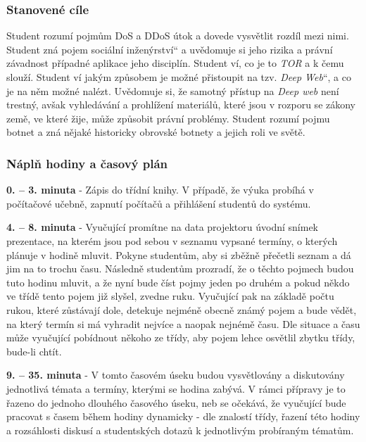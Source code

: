 \documentclass[a4paper, 12pt]{article}
\providecommand{\uv}[1]{\quotedblbase #1\textquotedblleft}
\begin{document}
\subsubsection{Stanovené cíle}
Student rozumí pojmům DoS a DDoS útok a dovede vysvětlit rozdíl mezi nimi. Student zná pojem \uv{sociální inženýrství} a uvědomuje si jeho rizika a právní závadnost případné aplikace jeho disciplín. Student ví, co je to \textit{TOR} a k čemu slouží. Student ví jakým způsobem je možné přistoupit na tzv. \uv{\textit{Deep Web}}, a co je na něm možné nalézt. Uvědomuje si, že samotný přístup na \textit{Deep web} není trestný, avšak vyhledávání a prohlížení materiálů, které jsou v rozporu se zákony země, ve které žije, může způsobit právní problémy. Student rozumí pojmu botnet a zná nějaké historicky obrovské botnety a jejich roli ve světě. 

\subsubsection{Náplň hodiny a časový plán}
\indent\textbf{0. -- 3. minuta} - Zápis do třídní knihy. V případě, že výuka probíhá v počítačové učebně, zapnutí počítačů a přihlášení studentů do systému.

\textbf{4. -- 8. minuta} - Vyučující promítne na data projektoru úvodní snímek prezentace, na kterém jsou pod sebou v seznamu vypsané termíny, o kterých plánuje v hodině mluvit. Pokyne studentům, aby si zběžně přečetli seznam a dá jim na to trochu času. Následně studentům prozradí, že o těchto pojmech budou tuto hodinu mluvit, a že nyní bude číst pojmy jeden po druhém a pokud někdo ve třídě tento pojem již slyšel, zvedne ruku. Vyučující pak na základě počtu rukou, které zůstávají dole, detekuje nejméně obecně známý pojem a bude vědět, na který termín si má vyhradit nejvíce a naopak nejnémě času. Dle situace a času může vyučující pobídnout někoho ze třídy, aby pojem lehce osvětlil zbytku třídy, bude-li chtít.

\textbf{9. -- 35. minuta} - V tomto časovém úseku budou vysvětlovány a diskutovány jednotlivá témata a termíny, kterými se hodina zabývá. V rámci přípravy je to řazeno do jednoho dlouhého časového úseku, neb se očekává, že vyučující bude pracovat s časem během hodiny dynamicky - dle znalostí třídy, řazení této hodiny a rozsáhlosti diskusí a studentských dotazů k jednotlivým probíraným tématům.
\end{document}
